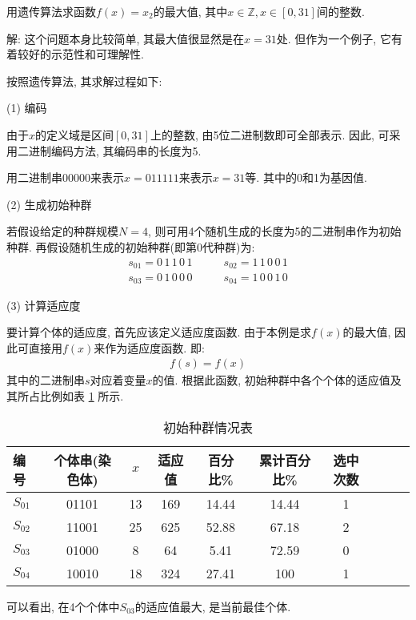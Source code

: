 \begin{example}
    用遗传算法求函数$f(x)=x_2$的最大值, 其中$x\in \mathbb Z, x\in [0,31]$间的整数.
\end{example}

解: 这个问题本身比较简单, 其最大值很显然是在$x=31$处. 但作为一个例子, 它有着较好的示范性和可理解性.

按照遗传算法, 其求解过程如下:

    (1) 编码

    由于$x$的定义域是区间$[0,31]$上的整数, 由5位二进制数即可全部表示. 因此, 可采用二进制编码方法, 其编码串的长度为5.

    \begin{example}
        用二进制串00000来表示$x=011111$来表示$x=31$等. 其中的0和1为基因值.
    \end{example}

    (2) 生成初始种群

    若假设给定的种群规模$N=4$, 则可用4个随机生成的长度为5的二进制串作为初始种群. 再假设随机生成的初始种群(即第0代种群)为:
\begin{align*}
  s_{01}=0\,  1\,  1\,  0\,  1 \qquad    & s_{02}=1\,  1\,  0\,  0\,  1\\
  s_{03}=0\,  1\,  0\,  0\,  0 \qquad    &  s_{04}=1\,  0\,  0\,  1\,  0
\end{align*}

 (3) 计算适应度

要计算个体的适应度, 首先应该定义适应度函数. 由于本例是求$f(x)$的最大值, 因此可直接用$f(x)$来作为适应度函数. 即:
\begin{align}
    f(s)=f(x)
\end{align}
其中的二进制串$s$对应着变量$x$的值. 根据此函数, 初始种群中各个个体的适应值及其所占比例如表 \ref{AI_table2019112802} 所示.
\begin{table}[H]
\caption{初始种群情况表}
\vspace{-0.6cm}
\begin{center}
\begin{tabular} {lccccccccc}
  \hline
编号&个体串(染色体)&	$x$	&适应值&	百分比\%&	累计百分比\%&	选中次数\\
\hline
$S_{01}$&     01101&	13&	169&	14.44&	14.44&	1\\
$S_{02}$&	11001&	25&	625&	52.88&	67.18&	2\\
$S_{03}$&	01000&	8&	64&	5.41&	72.59&	0\\
$S_{04}$&	10010&	18&	324&	27.41&	100&	1\\
\hline
\end{tabular}
\end{center}
\label{AI_table2019112802}\vspace{-0.4cm}
\end{table}
可以看出, 在4个个体中$S_{03}$的适应值最大, 是当前最佳个体.

